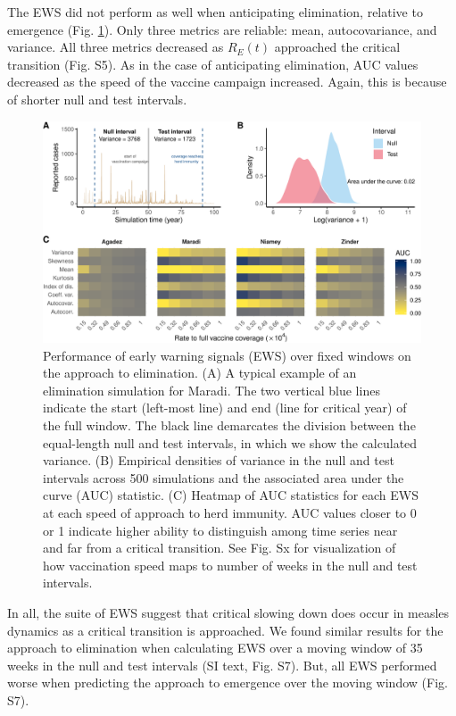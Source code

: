 \documentclass[3p]{elsarticle} %
\makeatletter
\def\maxwidth{\ifdim\Gin@nat@width>\linewidth\linewidth
\else\Gin@nat@width\fi}
\let\Oldincludegraphics\includegraphics
\renewcommand{\includegraphics}[1]{\Oldincludegraphics[width=\maxwidth]{#1}}
\makeatother
\begin{document}
The EWS did not perform as well when anticipating elimination, relative
to emergence (Fig. \ref{elim-aucs}). Only three metrics are reliable:
mean, autocovariance, and variance. All three metrics decreased as
\(R_E(t)\) approached the critical transition (Fig. S5). As in the case
of anticipating elimination, AUC values decreased as the speed of the
vaccine campaign increased. Again, this is because of shorter null and
test intervals.

\begin{figure}
\centering
\includegraphics{measles-ews-manuscript_files/figure-latex/elimination-1.pdf}
\caption{Performance of early warning signals (EWS) over fixed windows
on the approach to elimination. (A) A typical example of an elimination
simulation for Maradi. The two vertical blue lines indicate the start
(left-most line) and end (line for critical year) of the full window.
The black line demarcates the division between the equal-length null and
test intervals, in which we show the calculated variance. (B) Empirical
densities of variance in the null and test intervals across 500
simulations and the associated area under the curve (AUC) statistic. (C)
Heatmap of AUC statistics for each EWS at each speed of approach to herd
immunity. AUC values closer to 0 or 1 indicate higher ability to
distinguish among time series near and far from a critical transition.
See Fig. Sx for visualization of how vaccination speed maps to number of
weeks in the null and test intervals. \label{elim-aucs}}
\end{figure}

In all, the suite of EWS suggest that critical slowing down does occur
in measles dynamics as a critical transition is approached. We found
similar results for the approach to elimination when calculating EWS
over a moving window of 35 weeks in the null and test intervals (SI
text, Fig. S7). But, all EWS performed worse when predicting the
approach to emergence over the moving window (Fig. S7).
\end{document}
